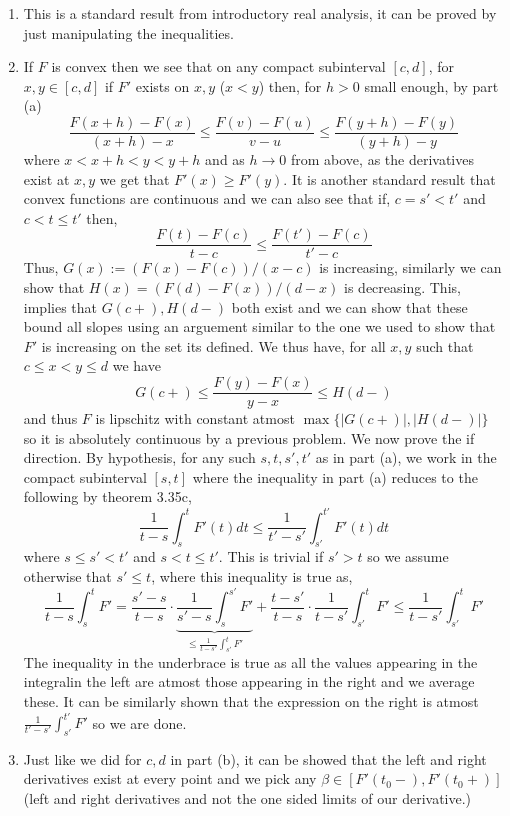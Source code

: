 \documentclass[12pt,a4paper]{article}
\begin{document}
\begin{solution}
\begin{enumerate}[label=\alph*.]
    \item This is a standard result from introductory real analysis, it can be proved by just manipulating the inequalities.
    \item If $F$ is convex then we see that on any compact subinterval $[c,d]$, for $x,y\in[c,d]$ if $F'$ exists on $x,y$ ($x<y$) then, for $h>0$ small enough, by part (a)
        \[
            \frac{F(x+h)-F(x)}{(x+h)-x}\leq\frac{F(v)-F(u)}{v-u}\leq\frac{F(y+h)-F(y)}{(y+h)-y}
        \]
        where $x<x+h<y<y+h$ and as $h\to 0$ from above, as the derivatives exist at $x,y$ we get that $F'(x)\geq F'(y).$ 
        It is another standard result that convex functions are continuous and we can also see that if, $c=s'<t'$ and $c<t\leq t'$ then,
        \[
            \frac{F(t)-F(c)}{t-c}\leq \frac{F(t')-F(c)}{t'-c}
        \]
        Thus, $G(x):=(F(x)-F(c))/(x-c)$ is increasing, similarly we can show that $H(x)=(F(d)-F(x))/(d-x)$ is decreasing. 
        This, implies that $G(c+),H(d-)$ both exist and we can show that these bound all slopes using an arguement similar to the one we used to show that $F'$ is increasing on the set its defined. 
        We thus have, for all $x,y$ such that $c\leq x<y\leq d$ we have
        \[
            G(c+)\leq\frac{F(y)-F(x)}{y-x}\leq H(d-)
        \]
        and thus $F$ is lipschitz with constant atmost $\max\{|G(c+)|,|H(d-)|\}$ so it is absolutely continuous by a previous problem. 
        We now prove the if direction. 
        By hypothesis, for any such $s,t,s',t'$ as in part (a), we work in the compact subinterval $[s,t]$ where the inequality in part (a) reduces to the following by theorem 3.35c,
        \[
            \frac1{t-s}\int_s^tF'(t)dt\leq\frac1{t'-s'}\int_{s'}^{t'}F'(t)dt
        \]
        where $s\leq s'<t'$ and $s<t\leq t'.$ 
        This is trivial if $s'>t$ so we assume otherwise that $s'\leq t$, where this inequality is true as, 
        \[
            \frac1{t-s}\int_s^tF'= \frac{s'-s}{t-s}\cdot\underbrace{\frac1{s'-s}\int_s^{s'}F'}_{\leq\frac1{t-s'}\int_{s'}^tF'}+ \frac{t-s'}{t-s}\cdot\frac1{t-s'}\int_{s'}^tF'\leq\frac1{t-s'}\int_{s'}^tF'
        \]
        The inequality in the underbrace is true as all the values appearing in the integralin the left are atmost those appearing in the right and we average these. 
        It can be similarly shown that the expression on the right is atmost $\frac1{t'-s'}\int_{s'}^{t'}F'$ so we are done. 
    \item Just like we did for $c,d$ in part (b), it can be showed that the left and right derivatives exist at every point and we pick any $\beta\in[F'(t_0-),F'(t_0+)]$ (left and right derivatives and not the one sided limits of our derivative.) 

\end{enumerate}
\end{solution}
\end{document}
